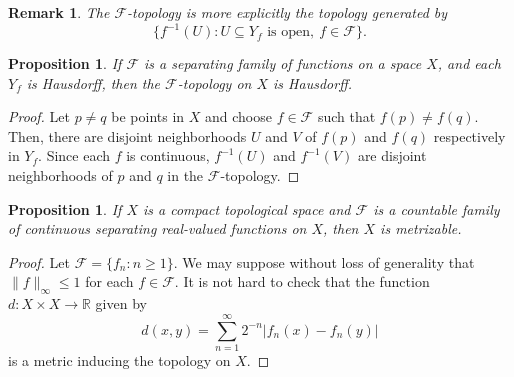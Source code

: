 \documentclass[12pt]{article}
\theoremstyle{thmstyle}
\newtheorem{proposition}[theorem]{Proposition}
\theoremstyle{defstyle}
\newtheorem{remark}[theorem]{Remark}
\newcommand{\R}{\mathbb{R}}
\newcommand{\scrF}{\mathscr F}
\renewcommand{\le}{\leqslant}
\renewcommand{\ge}{\geqslant}
\begin{document}
\begin{remark}
    The $\scrF$-topology is more explicitly the topology generated by 
    \begin{equation*}
        \{f^{-1}(U)\colon U\subseteq Y_f\text{ is open},~f\in\scrF\}.
    \end{equation*}
\end{remark}

\begin{proposition}
    If $\scrF$ is a separating family of functions on a space $X$, and each $Y_f$ is Hausdorff, then the $\scrF$-topology on $X$ is Hausdorff.
\end{proposition}
\begin{proof}
    Let $p\ne q$ be points in $X$ and choose $f\in\scrF$ such that $f(p)\ne f(q)$. Then, there are disjoint neighborhoods $U$ and $V$ of $f(p)$ and $f(q)$ respectively in $Y_f$. Since each $f$ is continuous, $f^{-1}(U)$ and $f^{-1}(V)$ are disjoint neighborhoods of $p$ and $q$ in the $\scrF$-topology.
\end{proof}

\begin{proposition}
    If $X$ is a compact topological space and $\scrF$ is a countable family of continuous separating real-valued functions on $X$, then $X$ is metrizable.
\end{proposition}
\begin{proof}
    Let $\scrF = \{f_n\colon n\ge 1\}$. We may suppose without loss of generality that $\|f\|_\infty\le 1$ for each $f\in\scrF$. It is not hard to check that the function $d: X\times X\to\R$ given by 
    \begin{equation*}
        d(x, y) = \sum_{n = 1}^\infty 2^{-n}|f_n(x) - f_n(y)|
    \end{equation*}
    is a metric inducing the topology on $X$.
\end{proof}
\end{document}
